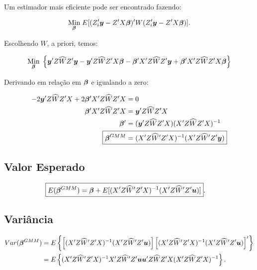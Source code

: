\documentclass[11pt,oneside,a4paper]{article}
\numberwithin{equation}{section}
\begin{document}
Um estimador mais eficiente pode ser encontrado fazendo:

\vspace{-1 em}
\begin{align*}
\underset{\boldsymbol{\beta}}{\text{Min}} \;
E[ ( Z_{i}' \boldsymbol{y} - Z' X \boldsymbol{\beta} )' W ( Z_{i}' \boldsymbol{y} - Z' X \boldsymbol{\beta} ) ].
\end{align*}

\noindent
Escolhendo $\widehat{W}$, a priori, temos:

\vspace{-1 em}
\begin{align*}
\underset{\boldsymbol{\beta}}{\text{Min}} \;
\left\{ 
\boldsymbol{y}' Z \widehat{W} Z' \boldsymbol{y}
-
\boldsymbol{y}' Z \widehat{W} Z' X \boldsymbol{\beta}
-
\boldsymbol{\beta}' X'  Z \widehat{W} Z' \boldsymbol{y}
+
\boldsymbol{\beta}' X'  Z \widehat{W} Z' X \boldsymbol{\beta}
\right\}
\end{align*}

Derivando em relação em $\boldsymbol{\beta}$ e igualando a zero:

\vspace{-1 em}
\begin{align*}
-2 \mbs{y}' Z \widehat{W} Z' X + 2 \mbs{\beta}'X' Z \widehat{W} Z' X &= 0
\\
\mbs{\beta}'X' Z \widehat{W} Z' X &= \mbs{y}' Z \widehat{W} Z' X 
\\
\mbs{\beta}' &= ( \mbs{y}' Z \widehat{W} Z' X ) ( X' Z \widehat{W} Z' X )^{-1}
\\
\Aboxed{
\mbs{\beta}^{GMM} &= ( X' Z \widehat{W}' Z' X )^{-1} ( X' Z \widehat{W}' Z' \mbs{y} ) }
\end{align*}

\subsection*{Valor Esperado} 

\vspace{-1 em}
\begin{align*}
\Aboxed{
E( \mbs{\beta}^{GMM} ) &=
\mbs{\beta} +
E[ ( X' Z \widehat{W}' Z' X )^{-1} ( X' Z \widehat{W}' Z' \mbs{u} ) ] }.
\end{align*}

\subsection*{Variância} 

\vspace{-1 em}
\begin{align*}
Var( \boldsymbol{\beta}^{GMM} ) &=
E \left\{ 
\left[ ( X' Z \widehat{W}' Z' X )^{-1} ( X' Z \widehat{W}' Z' \boldsymbol{u} ) \right]
\left[ ( X' Z \widehat{W}' Z' X )^{-1} ( X' Z \widehat{W}' Z' \boldsymbol{u} ) \right]'
\right\}
\\ &=
E \left\{ 
( X' Z \widehat{W}' Z' X )^{-1}
X' Z \widehat{W}' Z' \boldsymbol{u} \boldsymbol{u}' Z \widehat{W} Z' X 
( X' Z \widehat{W} Z' X )^{-1}
\right\}.
\end{align*}
\end{document}
